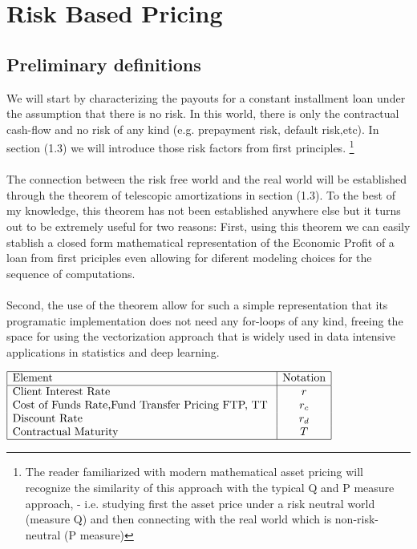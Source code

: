 
\chapter{Risk Based Pricing}
\section{ Preliminary definitions} 
We will start by characterizing the payouts for a constant installment loan under the assumption that there is no risk. In this world, there is only the contractual cash-flow and no risk of any kind (e.g. prepayment risk, default risk,etc). In section (1.3) we will introduce those risk factors from first principles.
\footnote{The reader familiarized with modern mathematical asset pricing will recognize the similarity of this approach with the typical Q and P measure approach, - i.e. studying first the asset price under a risk neutral world (measure Q) and then connecting with the real world which is non-risk-neutral (P measure) }
\\
\\
The connection between the risk free world and the real world will be established through the theorem of telescopic amortizations in section (1.3). To the best of my knowledge, this theorem has not been established anywhere else but it turns out to be extremely useful for two reasons: First, using this theorem we can easily stablish a closed form mathematical representation of the Economic Profit of a loan from first priciples even allowing for diferent modeling choices for the sequence of computations. 
\\ 
\\
Second, the use of the theorem allow for such a simple representation that its programatic implementation does not need any for-loops of any kind, freeing the space for using the vectorization approach that is widely used in data intensive applications in statistics and deep learning.


\renewcommand{\arraystretch}{1.5} %
\begin{center} %
\begin{math} %
\begin{array}{|l|c|l|} \hline %
\mbox{Element} & \mbox{Notation}\\ \hline
\mbox{Client Interest Rate}  & r \\
\mbox{Cost of Funds Rate,Fund Transfer Pricing FTP, TT   }  & r_c \\
\mbox{Discount Rate }  & r_d\\
\mbox{Contractual Maturity }  & T \\
\hline
\end{array} %
\end{math}%
\end{center}



